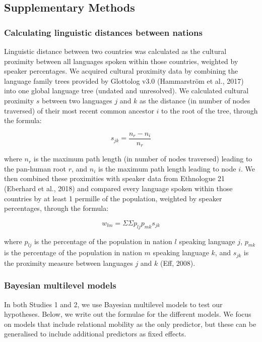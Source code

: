 \documentclass[
  man,floatsintext]{apa6}
\begin{document}
\hypertarget{supplementary-methods}{%
\subsection{Supplementary Methods}\label{supplementary-methods}}

\hypertarget{calculating-linguistic-distances-between-nations}{%
\subsubsection{Calculating linguistic distances between nations}\label{calculating-linguistic-distances-between-nations}}

Linguistic distance between two countries was calculated as the cultural proximity between all languages spoken within those countries, weighted by speaker percentages. We acquired cultural proximity data by combining the language family trees provided by Glottolog v3.0 (Hammarström et al., 2017) into one global language tree (undated and unresolved). We calculated cultural proximity \(s\) between two languages \(j\) and \(k\) as the distance (in number of nodes traversed) of their most recent common ancestor \(i\) to the root of the tree, through the formula:

\[
s_{jk} = \frac{n_{r}-n_{i}}{n_{r}}
\]

where \(n_{r}\) is the maximum path length (in number of nodes traversed) leading to the pan-human root \(r\), and \(n_{i}\) is the maximum path length leading to node \(i\). We then combined these proximities with speaker data from Ethnologue 21 (Eberhard et al., 2018) and compared every language spoken within those countries by at least 1 permille of the population, weighted by speaker percentages, through the formula:

\[
w_{lm} = {\Sigma}{\Sigma}p_{lj}p_{mk}s_{jk}
\]

where \(p_{lj}\) is the percentage of the population in nation \(l\) speaking language \(j\), \(p_{mk}\) is the percentage of the population in nation \(m\) speaking language \(k\), and \(s_{jk}\) is the proximity measure between languages \(j\) and \(k\) (Eff, 2008).

\hypertarget{bayesian-multilevel-models}{%
\subsubsection{Bayesian multilevel models}\label{bayesian-multilevel-models}}

In both Studies 1 and 2, we use Bayesian multilevel models to test our hypotheses. Below, we write out the formulae for the different models. We focus on models that include relational mobility as the only predictor, but these can be generalised to include additional predictors as fixed effects.
\end{document}
